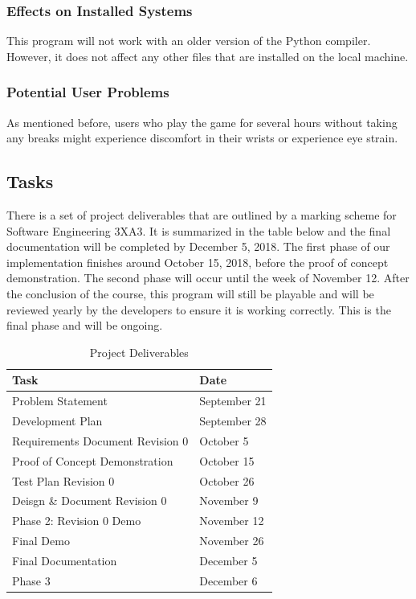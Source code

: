 \documentclass[12pt, titlepage]{article}
\begin{document}
\subsubsection{Effects on Installed Systems}
This program will not work with an older version of the Python compiler. However, it does not affect any other files that are installed on the local machine. 

\subsubsection{Potential User Problems}
As mentioned before, users who play the game for several hours without taking any breaks might experience discomfort in their wrists or experience eye strain. 

\subsection{Tasks}
There is a set of project deliverables that are outlined by a marking scheme for Software Engineering 3XA3. It is summarized in the table below and the final documentation will be completed by December 5, 2018. The first phase of our implementation finishes around October 15, 2018, before the proof of concept demonstration. The second phase will occur until the week of November 12. After the conclusion of the course, this program will still be playable and will be reviewed yearly by the developers to ensure it is working correctly. This is the final phase and will be ongoing. 

\begin{table}
\begin{center}
\caption{Project Deliverables}
\begin{tabular}{ | l | l | }
\hline
Task & Date \\
\hline
Problem Statement & September 21 \\
Development Plan & September 28 \\
Requirements Document Revision 0 & October 5\\
Proof of Concept Demonstration & October 15\\
Test Plan Revision 0 & October 26\\
Deisgn \& Document Revision 0 & November 9\\
Phase 2: Revision 0 Demo & November 12\\
Final Demo & November 26\\
Final Documentation & December 5\\
Phase 3 & December 6\\
\hline
\end{tabular}
\end{center}
\end{table} 
\end{document}
